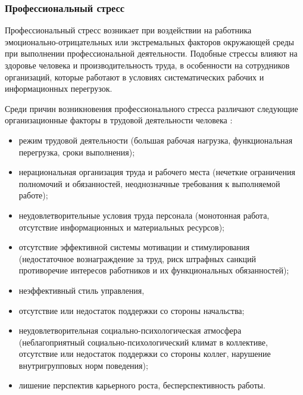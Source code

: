 \subsubsection{Профессиональный стресс}
Профессиональный стресс возникает при воздействии на работника эмоционально-отрицательных или экстремальных факторов окружающей среды при выполнении профессиональной деятельности. Подобные стрессы влияют на здоровье человека и производительность труда, в особенности на сотрудников организаций, которые работают в условиях систематических рабочих и информационных перегрузок. \cite{professionalStress}

Среди причин возникновения профессионального стресса различают следующие организационные факторы в трудовой деятельности человека \cite{professionalStress}:
\begin{itemize}[leftmargin=1.6\parindent]
\item режим трудовой деятельности (большая рабочая нагрузка, функциональная перегрузка, сроки выполнения);
\item нерациональная организация труда и рабочего места (нечеткие ограничения полномочий и обязанностей, неоднозначные требования к выполняемой работе);
\item неудовлетворительные условия труда персонала (монотонная работа, отсутствие информационных и материальных ресурсов);
\item отсутствие эффективной системы мотивации и стимулирования (недостаточное вознаграждение за труд, риск штрафных санкций противоречие интересов работников и их функциональных обязанностей);
\item неэффективный стиль управления, 
\item отсутствие или недостаток поддержки со стороны начальства;
\item неудовлетворительная социально-психологическая атмосфера (неблагоприятный социально-психологический климат в коллективе, отсутствие или недостаток поддержки со стороны коллег, нарушение внутригрупповых норм поведения);
\item лишение перспектив карьерного роста, бесперспективность работы.
\end{itemize}


